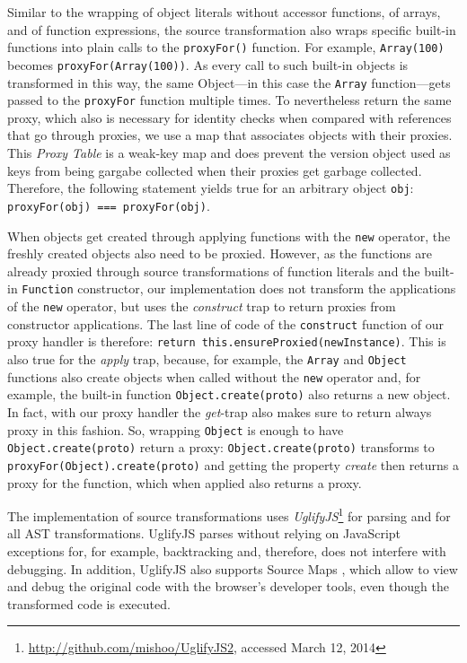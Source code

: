 Similar to the wrapping of object literals without accessor functions, of arrays, and of function expressions, the source transformation also wraps specific built-in functions into plain calls to the \lstinline{proxyFor()} function.
For example, \lstinline{Array(100)} becomes \lstinline{proxyFor(Array(100))}.
As every call to such built-in objects is transformed in this way, the same Object---in this case the \lstinline{Array} function---gets passed to the \lstinline{proxyFor} function multiple times.
To nevertheless return the same proxy, which also is necessary for identity checks when compared with references that go through proxies, we use a map that associates objects with their proxies.
This \emph{Proxy Table} is a weak-key map and does prevent the version object used as keys from being gargabe collected when their proxies get garbage collected.
Therefore, the following statement yields true for an arbitrary object \lstinline{obj}: \lstinline{proxyFor(obj) === proxyFor(obj)}.

When objects get created through applying functions with the \lstinline{new} operator, the freshly created objects also need to be proxied.
However, as the functions are already proxied through source transformations of function literals and the built-in \lstinline{Function} constructor, our implementation does not transform the applications of the \lstinline{new} operator, but uses the \emph{construct} trap to return proxies from constructor applications.
The last line of code of the \lstinline{construct} function of our proxy handler is therefore: \lstinline{return this.ensureProxied(newInstance)}.
This is also true for the \emph{apply} trap, because, for example, the \lstinline{Array} and \lstinline{Object} functions also create objects when called without the \lstinline{new} operator and, for example, the built-in function \lstinline{Object.create(proto)} also returns a new object.
In fact, with our proxy handler the \emph{get}-trap also makes sure to return always proxy in this fashion.
So, wrapping \lstinline{Object} is enough to have \lstinline{Object.create(proto)} return a proxy: \lstinline{Object.create(proto)} transforms to \lstinline{proxyFor(Object).create(proto)} and getting the property \emph{create} then returns a proxy for the function, which when applied also returns a proxy.

The implementation of source transformations uses \emph{UglifyJS}\footnote{\url{http://github.com/mishoo/UglifyJS2}, accessed March 12, 2014} for parsing and for all AST transformations.
UglifyJS parses without relying on JavaScript exceptions for, for example, backtracking and, therefore, does not interfere with debugging.
In addition, UglifyJS also supports Source Maps , which allow to view and debug the original code with the browser's developer tools, even though the transformed code is executed.


